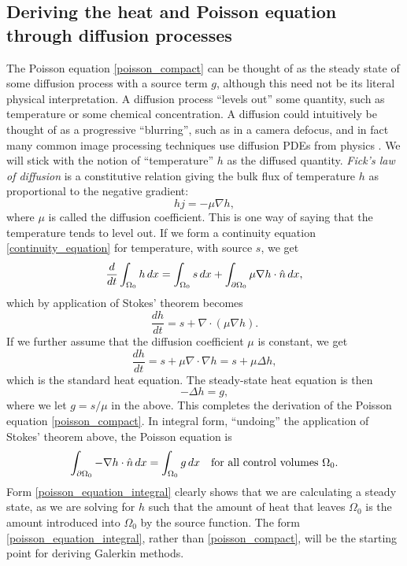 \subsection{Deriving the heat and Poisson equation through diffusion processes}
The Poisson equation \eqref{poisson_compact} can be thought of as the steady state of some diffusion process with a source term $g$,
although this need not be its literal physical interpretation.
A diffusion process ``levels out'' some quantity, such as temperature or some chemical concentration.
A diffusion could intuitively be thought of as a
progressive ``blurring'',
such as in a camera defocus, and in fact many common image processing techniques use diffusion PDEs from physics \cite{tum}. We will stick with
the notion of ``temperature'' $h$ as the diffused quantity.
\textit{Fick's law of diffusion} is a constitutive relation giving the bulk flux of temperature $h$ as proportional to the negative gradient:
    $$hj = -\mu\nabla h,$$
where $\mu$ is called the diffusion coefficient.
This is one way of saying that the temperature tends to level out.
If we form a continuity equation \eqref{continuity_equation} for temperature, with source $s$, we get
\begin{equation}\label{heat_equation_integral}
    \frac{d}{dt} \int_{\Omega_0} h\,dx = \int_{\Omega_0} s\,dx + \int_{{\partial\Omega_0}} \mu \nabla h \cdot \hat{n}\,dx,
\end{equation}
which by application of Stokes' theorem becomes
\begin{equation}\label{heat_equation_differential}
    \frac{dh}{dt} = s + \nabla \cdot \left(\mu \nabla h\right).
\end{equation}
If we further assume that the diffusion coefficient $\mu$ is constant, we get
\begin{equation}\label{heat_equation_differential_constant}
    \frac{dh}{dt} = s + \mu\nabla \cdot \nabla h = s + \mu\Delta h,
\end{equation}
which is the standard heat equation.
The steady-state heat equation is then
\begin{equation}\label{poisson_equation}
    -\Delta h = g,
\end{equation}
where we let $g = s/\mu$ in the above.
This completes the derivation of the Poisson equation \eqref{poisson_compact}.
In integral form, ``undoing'' the application of Stokes' theorem above, the Poisson equation is
\begin{equation}\label{poisson_equation_integral}
    \int_{{\partial\Omega_0}} -\nabla h\cdot \hat{n}\,dx = \int_{{\Omega_0}} g\,dx \quad \text{for all control volumes $\Omega_0$.}
\end{equation}
Form \eqref{poisson_equation_integral} clearly shows that we are calculating a steady state,
as we are solving for $h$ such that the amount of heat that leaves $\Omega_0$ is the amount introduced into $\Omega_0$ by the source function.
The form \eqref{poisson_equation_integral}, rather than \eqref{poisson_compact}, will be the starting point for deriving Galerkin methods.

